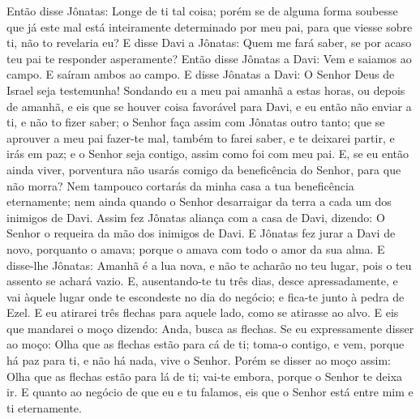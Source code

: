 Então disse Jônatas: Longe de ti tal coisa; porém se de alguma
forma soubesse que já este mal está inteiramente determinado por meu
pai, para que viesse sobre ti, não to revelaria eu? E disse
Davi a Jônatas: Quem me fará saber, se por acaso teu pai te
responder asperamente? Então disse Jônatas a Davi: Vem e
saiamos ao campo. E saíram ambos ao campo. E disse Jônatas a
Davi: O Senhor Deus de Israel seja testemunha! Sondando eu a meu pai
amanhã a estas horas, ou depois de amanhã, e eis que se houver coisa
favorável para Davi, e eu então não enviar a ti, e não to fizer
saber; o Senhor faça assim com Jônatas outro tanto; que se
aprouver a meu pai fazer-te mal, também to farei saber, e te
deixarei partir, e irás em paz; e o Senhor seja contigo, assim como
foi com meu pai. E, se eu então ainda viver, porventura não
usarás comigo da beneficência do Senhor, para que não morra?
Nem tampouco cortarás da minha casa a tua beneficência
eternamente; nem ainda quando o Senhor desarraigar da terra a cada
um dos inimigos de Davi. Assim fez Jônatas aliança com a casa
de Davi, dizendo: O Senhor o requeira da mão dos inimigos de Davi.
E Jônatas fez jurar a Davi de novo, porquanto o amava; porque
o amava com todo o amor da sua alma. E disse-lhe Jônatas:
Amanhã é a lua nova, e não te acharão no teu lugar, pois o teu
assento se achará vazio. E, ausentando-te tu três dias, desce
apressadamente, e vai àquele lugar onde te escondeste no dia do
negócio; e fica-te junto à pedra de Ezel. E eu atirarei três
flechas para aquele lado, como se atirasse ao alvo. E eis que
mandarei o moço dizendo: Anda, busca as flechas. Se eu expressamente
disser ao moço: Olha que as flechas estão para cá de ti; toma-o
contigo, e vem, porque há paz para ti, e não há nada, vive o Senhor.
Porém se disser ao moço assim: Olha que as flechas estão para
lá de ti; vai-te embora, porque o Senhor te deixa ir. E
quanto ao negócio de que eu e tu falamos, eis que o Senhor está
entre mim e ti eternamente.

